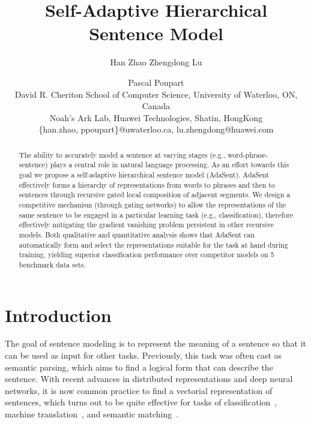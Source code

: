 \documentclass{article}
\title{Self-Adaptive Hierarchical Sentence Model}
\author{Han Zhao \quad Zhengdong Lu \and Pascal Poupart \\
David R. Cheriton School of Computer Science, University of Waterloo, ON, Canada\\
Noah's Ark Lab, Huawei Technologies, Shatin, HongKong \\
\{han.zhao, ppoupart\}@uwaterloo.ca, lu.zhengdong@huawei.com
}
\theoremstyle{definition}
\begin{document}
\maketitle

\begin{abstract}
The ability to accurately model a sentence at varying stages (e.g., word-phrase-sentence) plays a central role in natural language processing. As an effort towards this goal we propose a self-adaptive hierarchical sentence model (AdaSent). AdaSent effectively forms a hierarchy of representations from words to phrases and then to sentences through recursive gated local composition of adjacent segments. We design a competitive mechanism (through gating networks) to allow the representations of the same sentence to be engaged in a particular learning task (e.g., classification), therefore effectively mitigating the gradient vanishing problem persistent in other recursive models.  Both qualitative and quantitative analysis shows that AdaSent can automatically form and select the representations suitable for the task at hand during training, yielding superior classification performance over competitor models on 5 benchmark data sets.
\end{abstract}

\section{Introduction}
The goal of sentence modeling is to represent the meaning of a sentence so that it can be used as input for other tasks. Previously, this task was often cast as semantic parsing, which aims to find a logical form that can describe the sentence. With recent advances in distributed representations and deep neural networks, it is now common practice to find a vectorial representation of sentences, which turns out to be quite effective for tasks of classification~\cite{kim2014convolutional}, machine translation~\cite{cho2014properties,bahdanau2014neural}, and semantic matching~\cite{hu2014convolutional}.
\end{document}
